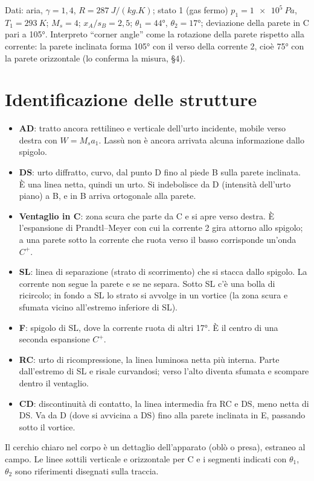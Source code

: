 \documentclass[11pt,a4paper]{article}
\newcommand{\Ms}{M_{s}}
\newcommand{\Cp}{C^{+}}
\begin{document}
Dati: aria, $\gamma=1{,}4$, $R=\SI{287}{J/(kg.K)}$; stato 1 (gas fermo) $p_1=\SI{1e5}{Pa}$, $T_1=\SI{293}{K}$;
$\Ms=4$; $x_A/s_B=2{,}5$; $\theta_1=\ang{44}$, $\theta_2=\ang{17}$; deviazione della parete in C pari a \ang{105}.
Interpreto ``corner angle'' come la rotazione della parete rispetto alla corrente: la parete inclinata forma
\ang{105} con il verso della corrente 2, cioè \ang{75} con la parete orizzontale (lo conferma la misura, §4).

\section{Identificazione delle strutture}
\begin{itemize}
\item \textbf{AD}: tratto ancora rettilineo e verticale dell'urto incidente, mobile verso destra con
  $W=\Ms a_1$. Lassù non è ancora arrivata alcuna informazione dallo spigolo.
\item \textbf{DS}: urto diffratto, curvo, dal punto D fino al piede B sulla parete inclinata. È una linea netta, quindi
  un urto. Si indebolisce da D (intensità dell'urto piano) a B, e in B arriva ortogonale alla parete.
\item \textbf{Ventaglio in C}: zona scura che parte da C e si apre verso destra. È l'espansione di Prandtl--Meyer
  con cui la corrente 2 gira attorno allo spigolo; a una parete sotto la corrente che ruota verso il basso corrisponde
  un'onda $\Cp$.
\item \textbf{SL}: linea di separazione (strato di scorrimento) che si stacca dallo spigolo. La corrente non segue la
  parete e se ne separa. Sotto SL c'è una bolla di ricircolo; in fondo a SL lo strato si avvolge in un vortice (la zona
  scura e sfumata vicino all'estremo inferiore di SL).
\item \textbf{F}: spigolo di SL, dove la corrente ruota di altri \ang{17}. È il centro di una seconda espansione $\Cp$.
\item \textbf{RC}: urto di ricompressione, la linea luminosa netta più interna. Parte dall'estremo di SL e risale
  curvandosi; verso l'alto diventa sfumata e scompare dentro il ventaglio.
\item \textbf{CD}: discontinuità di contatto, la linea intermedia fra RC e DS, meno netta di DS. Va da D (dove si
  avvicina a DS) fino alla parete inclinata in E, passando sotto il vortice.
\end{itemize}
Il cerchio chiaro nel corpo è un dettaglio dell'apparato (oblò o presa), estraneo al campo. Le linee sottili
verticale e orizzontale per C e i segmenti indicati con $\theta_1$, $\theta_2$ sono riferimenti disegnati sulla traccia.
\end{document}
